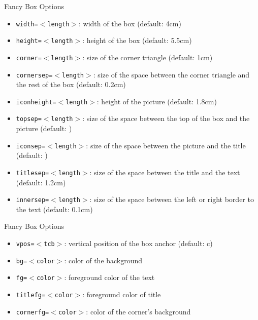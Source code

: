 \documentclass[english,sectioncirclenumberstyle]{ciadbeamer}
\begin{document}
\begin{frame}{{Fancy Box} Options}
	\begin{itemize}
	\item \texttt{width=\ensuremath{<}length\ensuremath{>}}: width of the box (default: 4cm)
	\item \texttt{height=\ensuremath{<}length\ensuremath{>}}: height of the box (default: 5.5cm)
	\item \texttt{corner=\ensuremath{<}length\ensuremath{>}}: size of the corner triangle (default: 1cm)
	\item \texttt{cornersep=\ensuremath{<}length\ensuremath{>}}: size of the space between the corner triangle and the rest of the box (default: 0.2cm)
	\item \texttt{iconheight=\ensuremath{<}length\ensuremath{>}}: height of the picture (default: 1.8cm)
	\item \texttt{topsep=\ensuremath{<}length\ensuremath{>}}: size of the space between the top of the box and the picture (default: \the\bigskipamount)
	\item \texttt{iconsep=\ensuremath{<}length\ensuremath{>}}: size of the space between the picture and the title (default: \the\medskipamount)
	\item \texttt{titlesep=\ensuremath{<}length\ensuremath{>}}: size of the space between the title and the text (default: 1.2cm)
	\item \texttt{innersep=\ensuremath{<}length\ensuremath{>}}: size of the space between the left or right border to the text (default: 0.1cm)
	\end{itemize}
\end{frame}

\begin{frame}{{Fancy Box} Options \insertcontinuationtext}
	\begin{itemize}
	\item \texttt{vpos=\ensuremath{<}tcb\ensuremath{>}}: vertical position of the box anchor (default: c)
	\item \texttt{bg=\ensuremath{<}color\ensuremath{>}}: color of the background
	\item \texttt{fg=\ensuremath{<}color\ensuremath{>}}: foreground color of the text
	\item \texttt{titlefg=\ensuremath{<}color\ensuremath{>}}: foreground color of title
	\item \texttt{cornerfg=\ensuremath{<}color\ensuremath{>}}: color of the corner's background
	\end{itemize}
\end{frame}
\end{document}
